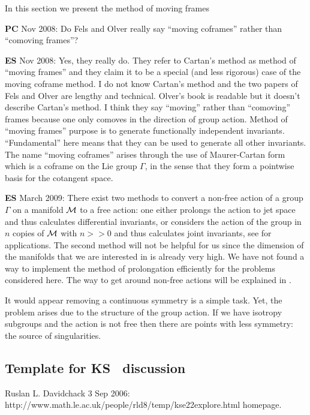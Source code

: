 In this section we present the method of moving frames

{\bf PC} Nov 2008:
Do Fels and Olver really say
``moving coframes'' rather than ``comoving frames''?

{\bf ES}  Nov 2008: Yes, they really do. They refer to
Cartan's method as method of ``moving frames'' and they claim
it to be a special (and less rigorous) case of the moving
coframe method. I do not know Cartan's method and the two
papers of Fels and Olver are
lengthy and technical. Olver's book is readable but it
doesn't describe Cartan's method. I think they say ``moving''
rather than ``comoving'' frames because one only comoves in
the direction of group action.
Method of ``moving frames'' purpose is to generate
functionally independent invariants. ``Fundamental'' here means that they can be
used to generate all other invariants.
The name ``moving coframes'' arises through the use of
Maurer-Cartan form which is a coframe on the Lie group
$\Gamma$, in the sense that they form a pointwise basis for
the cotangent space.

{\bf ES} March 2009:
There exist two methods to convert a non-free action of a group $\Gamma$ on a manifold $\mathcal{M}$
to a free action: one either prolongs the action to jet space
and thus calculates differential invariants, or considers the
action of the group in $n$ copies of $\mathcal{M}$ with $n>>0$ and
thus calculates joint invariants, see  for
applications. The second method will not be helpful for us
since the dimension of the manifolds that we are interested
in is already very high. We have not found a way to implement
the method of prolongation efficiently for the problems
considered here. The way to get around non-free actions will
be explained in .

It would appear removing a continuous symmetry is a simple
task. Yet, the problem arises due to the structure of the
group action. If we have isotropy subgroups and the action is
not free then there are points with less symmetry: the source
of singularities.


\subsection{Template for KS \eqva\ discussion}

Ruslan L. Davidchack 3 Sep 2006:
http://www.math.le.ac.uk/people/rld8/temp/kse22explore.html homepage.


